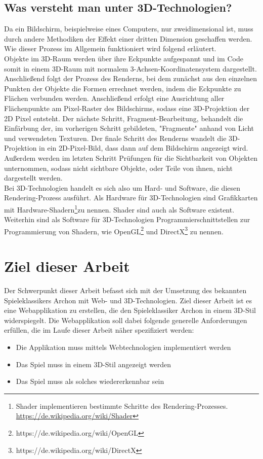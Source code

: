 \subsection{Was versteht man unter 3D-Technologien?}
Da ein Bildschirm, beispielweise eines Computers, nur zweidimensional ist, muss durch andere Methodiken der Effekt einer dritten Dimension geschaffen werden. Wie dieser Prozess im Allgemein funktioniert wird folgend erläutert.\\Objekte im 3D-Raum werden über ihre Eckpunkte aufgespannt und im Code somit in einem 3D-Raum mit normalem 3-Achsen-Koordinatensystem dargestellt. Anschließend folgt der Prozess des Renderns, bei dem zunächst aus den einzelnen Punkten der Objekte die Formen errechnet werden, indem die Eckpunkte zu Flächen verbunden werden. Anschließend erfolgt eine Ausrichtung aller Flächenpunkte am Pixel-Raster des Bildschirms, sodass eine 3D-Projektion der 2D Pixel entsteht. Der nächste Schritt, Fragment-Bearbeitung, behandelt die Einfärbung der, im vorherigen Schritt gebildeten, "Fragmente" anhand von Licht und verwendeten Texturen. Der finale Schritt des Renderns wandelt die 3D-Projektion in ein 2D-Pixel-Bild, dass dann auf dem Bildschirm angezeigt wird. Außerdem werden im letzten Schritt Prüfungen für die Sichtbarkeit von Objekten unternommen, sodass nicht sichtbare Objekte, oder Teile von ihnen, nicht dargestellt werden.\\
Bei 3D-Technologien handelt es sich also um Hard- und Software, die diesen Rendering-Prozess ausführt. Als Hardware für 3D-Technologien sind Grafikkarten mit Hardware-Shadern\footnote{Shader implementieren bestimmte Schritte des Rendering-Prozesses. \url{https://de.wikipedia.org/wiki/Shader}}zu nennen. Shader sind auch als Software existent. Weiterhin sind als Software für 3D-Technologien Programmierschnittstellen zur Programmierung von Shadern, wie OpenGL\footnote{https://de.wikipedia.org/wiki/OpenGL} und DirectX\footnote{https://de.wikipedia.org/wiki/DirectX} zu nennen.

\section{Ziel dieser Arbeit}
\label{sec:ziel_dieser_arbeit}
Der Schwerpunkt dieser Arbeit befasst sich mit der Umsetzung des bekannten Spieleklassikers Archon mit Web- und 3D-Technologien.
Ziel dieser Arbeit ist es eine Webapplikation zu erstellen, die den Spieleklassiker Archon in einem 3D-Stil widerspiegelt.
Die Webapplikation soll dabei folgende generelle Anforderungen erfüllen, die im Laufe dieser Arbeit näher spezifiziert werden:
\begin{itemize}
	\item Die Applikation muss mittels Webtechnologien implementiert werden
	\item Das Spiel muss in einem 3D-Stil angezeigt werden
	\item Das Spiel muss als solches wiedererkennbar sein
\end{itemize}

